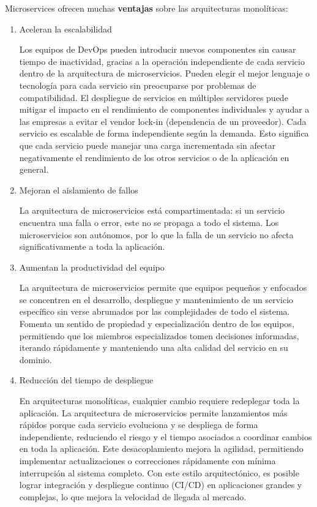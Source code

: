 \documentclass[12pt]{book}
\begin{document}
Microservices ofrecen muchas \textbf{ventajas} sobre las arquitecturas monolíticas:
\begin{enumerate}
    \item Aceleran la escalabilidad

Los equipos de DevOps pueden introducir nuevos componentes sin causar tiempo de inactividad, gracias a la operación independiente de cada servicio dentro de la arquitectura de microservicios. Pueden elegir el mejor lenguaje o tecnología para cada servicio sin preocuparse por problemas de compatibilidad. 
El despliegue de servicios en múltiples servidores puede mitigar el impacto en el rendimiento de componentes individuales y ayudar a las empresas a evitar el vendor lock-in (dependencia de un proveedor). 
Cada servicio es escalable de forma independiente según la demanda. Esto significa que cada servicio puede manejar una carga incrementada sin afectar negativamente el rendimiento de los otros servicios o de la aplicación en general.

    \item Mejoran el aislamiento de fallos

La arquitectura de microservicios está compartimentada: si un servicio encuentra una falla o error, este no se propaga a todo el sistema. 
Los microservicios son autónomos, por lo que la falla de un servicio no afecta significativamente a toda la aplicación.

    \item Aumentan la productividad del equipo

La arquitectura de microservicios permite que equipos pequeños y enfocados se concentren en el desarrollo, despliegue y mantenimiento de un servicio específico sin verse abrumados por las complejidades de todo el sistema. 
Fomenta un sentido de propiedad y especialización dentro de los equipos, permitiendo que los miembros especializados tomen decisiones informadas, iterando rápidamente y manteniendo una alta calidad del servicio en su dominio.

    \item Reducción del tiempo de despliegue

En arquitecturas monolíticas, cualquier cambio requiere redeplegar toda la aplicación. La arquitectura de microservicios permite lanzamientos más rápidos porque cada servicio evoluciona y se despliega de forma independiente, reduciendo el riesgo y el tiempo asociados a coordinar cambios en toda la aplicación. 
Este desacoplamiento mejora la agilidad, permitiendo implementar actualizaciones o correcciones rápidamente con mínima interrupción al sistema completo. 
Con este estilo arquitectónico, es posible lograr integración y despliegue continuo (CI/CD) en aplicaciones grandes y complejas, lo que mejora la velocidad de llegada al mercado.


\end{enumerate}
\end{document}
